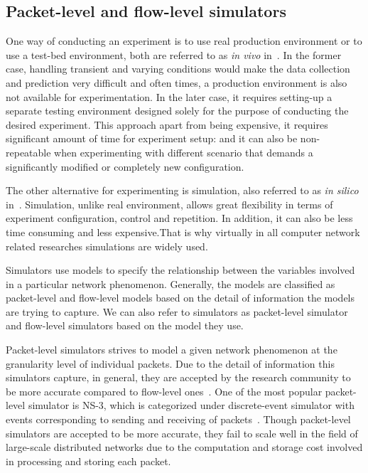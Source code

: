\subsection{Packet-level and flow-level simulators}
\label{section:packetflow} 
One way of conducting an experiment is to use real production environment or to use a test-bed environment, both are referred to as \emph{in vivo} in~\cite{DBLP:journals/jpdc/CasanovaGLQS14}. In the former case, handling transient and varying conditions would make the data collection and prediction very difficult and often times, a production environment is also not available for experimentation. In the later case, it requires setting-up a separate testing environment designed solely for the purpose of conducting the desired experiment. This approach apart from being expensive, it requires significant amount of time for experiment setup: and it can also be non-repeatable when experimenting with different scenario that demands a significantly modified or completely new configuration.

The other alternative for experimenting is simulation, also referred to as \emph{in silico} in~\cite{DBLP:journals/jpdc/CasanovaGLQS14}. Simulation, unlike real environment, allows great flexibility in terms of experiment configuration, control and repetition. In addition, it can also be less time consuming and less expensive.That is why virtually in all computer network related researches simulations are widely used. 

Simulators use models to specify the relationship between the variables involved in a particular network phenomenon. Generally, the models are classified as packet-level and flow-level models based on the detail of information the models are trying to capture. We can also refer to simulators as packet-level simulator and flow-level simulators based on the model they use. 

Packet-level simulators strives to model a given network phenomenon at the granularity level of individual packets\cite{DBLP:conf/infocom/LiuFGKT01}. Due to the detail of information this simulators capture, in general, they are accepted by the research community to be more accurate compared to flow-level ones~\cite{DBLP:journals/jpdc/CasanovaGLQS14}. One of the most popular packet-level simulator is NS-3, which is categorized under discrete-event simulator with events corresponding to sending and receiving of packets~\cite{ns3}. Though packet-level simulators are accepted to be more accurate, they fail to scale well in the field of large-scale distributed networks due to the computation and storage cost involved in processing and storing each packet. 

